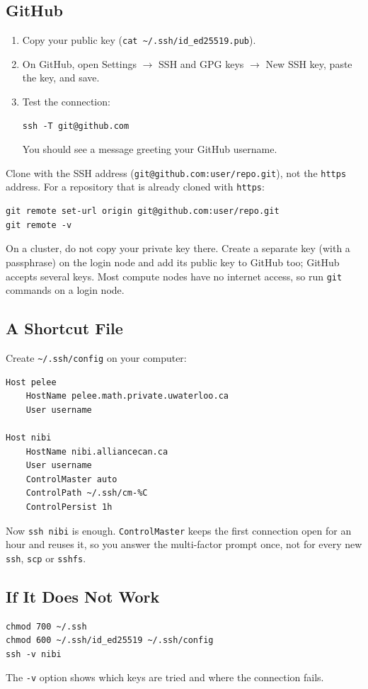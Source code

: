 \subsection{GitHub}

\begin{enumerate}
\item Copy your public key (\texttt{cat \textasciitilde/.ssh/id\_ed25519.pub}).
\item On GitHub, open Settings $\rightarrow$ SSH and GPG keys $\rightarrow$ New SSH key, paste
the key, and save.
\item Test the connection:
\begin{lstlisting}
ssh -T git@github.com
\end{lstlisting}
You should see a message greeting your GitHub username.
\end{enumerate}

Clone with the SSH address (\texttt{git@github.com:user/repo.git}), not the \texttt{https}
address. For a repository that is already cloned with \texttt{https}:

\begin{lstlisting}
git remote set-url origin git@github.com:user/repo.git
git remote -v
\end{lstlisting}

On a cluster, do not copy your private key there. Create a separate key (with a passphrase) on the
login node and add its public key to GitHub too; GitHub accepts several keys. Most compute nodes
have no internet access, so run \texttt{git} commands on a login node.

\subsection{A Shortcut File}

Create \texttt{\textasciitilde/.ssh/config} on your computer:

\begin{lstlisting}
Host pelee
    HostName pelee.math.private.uwaterloo.ca
    User username

Host nibi
    HostName nibi.alliancecan.ca
    User username
    ControlMaster auto
    ControlPath ~/.ssh/cm-%C
    ControlPersist 1h
\end{lstlisting}

Now \texttt{ssh nibi} is enough. \texttt{ControlMaster} keeps the first connection open for an
hour and reuses it, so you answer the multi-factor prompt once, not for every new \texttt{ssh},
\texttt{scp} or \texttt{sshfs}.

\subsection{If It Does Not Work}

\begin{lstlisting}
chmod 700 ~/.ssh
chmod 600 ~/.ssh/id_ed25519 ~/.ssh/config
ssh -v nibi
\end{lstlisting}

The \texttt{-v} option shows which keys are tried and where the connection fails.
